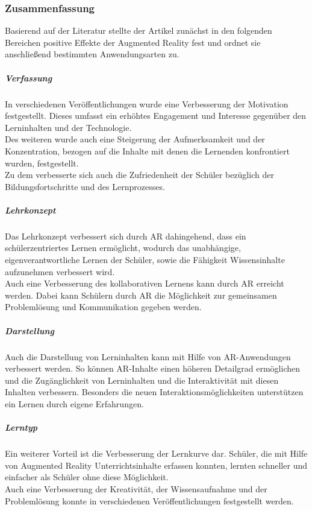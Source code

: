 \subsubsection{Zusammenfassung}
Basierend auf der Literatur stellte der Artikel zunächst in den folgenden Bereichen positive Effekte der Augmented Reality fest und ordnet sie anschließend bestimmten Anwendungsarten zu.

\subparagraph{Verfassung}
In verschiedenen Veröffentlichungen wurde eine Verbesserung der Motivation festgestellt. Dieses umfasst ein erhöhtes Engagement und Interesse gegenüber den Lerninhalten und der Technologie.\\
Des weiteren wurde auch eine Steigerung der Aufmerksamkeit und der Konzentration, bezogen auf die Inhalte mit denen die Lernenden konfrontiert wurden, festgestellt.\\
Zu dem verbesserte sich auch die Zufriedenheit der Schüler bezüglich der Bildungsfortschritte und des Lernprozesses. 
\citep[Kapitel 4.1]{diegmann:benefits-ar}

\subparagraph{Lehrkonzept}
Das Lehrkonzept verbessert sich durch AR  dahingehend, dass ein schülerzentriertes Lernen ermöglicht, wodurch das unabhängige, eigenverantwortliche Lernen der Schüler, sowie die Fähigkeit Wissensinhalte aufzunehmen verbessert wird.\\
Auch eine Verbesserung des kollaborativen Lernens kann durch AR erreicht werden. Dabei kann Schülern durch AR die Möglichkeit zur gemeinsamen Problemlösung und Kommunikation gegeben werden.
\citep[Kapitel 4.2]{diegmann:benefits-ar}

\subparagraph{Darstellung}
Auch die Darstellung von Lerninhalten kann mit Hilfe von AR-Anwendungen verbessert werden. So können AR-Inhalte einen höheren Detailgrad ermöglichen und die Zugänglichkeit von Lerninhalten und die Interaktivität mit diesen Inhalten verbessern. Besonders die neuen Interaktionsmöglichkeiten unterstützen ein Lernen durch eigene Erfahrungen.
\citep[Kapitel 4.3]{diegmann:benefits-ar}

\subparagraph{Lerntyp}
Ein weiterer Vorteil ist die Verbesserung der Lernkurve dar. Schüler, die mit Hilfe von Augmented Reality Unterrichtsinhalte erfassen konnten, lernten schneller und einfacher als Schüler ohne diese Möglichkeit.\\
Auch eine Verbesserung der Kreativität, der Wissensaufnahme und der Problemlösung konnte in verschiedenen Veröffentlichungen festgestellt werden.
\citep[Kapitel 4.4]{diegmann:benefits-ar}

